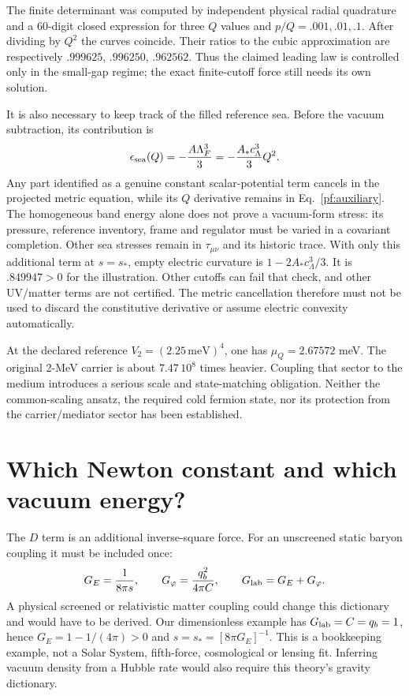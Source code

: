 \documentclass[11pt]{article}
\begin{document}
The finite determinant was computed by independent physical radial
quadrature and a 60-digit closed expression for three $Q$ values and
$p/Q=.001,.01,.1$. After dividing by $Q^2$ the curves coincide.
Their ratios to the cubic approximation are respectively
$.999625$, $.996250$, $.962562$. Thus the claimed leading law is controlled
only in the small-gap regime; the exact finite-cutoff force still needs
its own solution.

It is also necessary to keep track of the filled reference sea. Before
the vacuum subtraction, its contribution is
\begin{equation}
 \epsilon_{\rm sea}(Q)=-{A\Lambda_F^3\over3}
       =-{A_*c_\Lambda^3\over3}Q^2.
\end{equation}
Any part identified as a genuine constant scalar-potential term cancels
in the projected metric equation, while its $Q$ derivative remains in
Eq.~\eqref{pf:auxiliary}. The homogeneous band energy alone does not prove
a vacuum-form stress: its pressure, reference inventory, frame and regulator
must be varied in a covariant completion. Other sea stresses remain in
$\tau_{\mu\nu}$ and its historic trace. With only this
additional term at $s=s_*$, empty electric curvature is
$1-2A_*c_\Lambda^3/3$. It is $.849947>0$ for the illustration.
Other cutoffs can fail that check, and other UV/matter terms are not
certified. The metric cancellation therefore must not be used to discard
the constitutive derivative or assume electric convexity automatically.

At the declared reference $V_2=(2.25\,\mathrm{meV})^4$, one has
$\mu_Q=2.67572$ meV. The original 2-MeV carrier is about
$7.47\,10^8$ times heavier. Coupling that sector to the medium introduces
a serious scale and state-matching obligation. Neither the common-scaling
ansatz, the required cold fermion state, nor its protection from the
carrier/mediator sector has been established.

\section{Which Newton constant and which vacuum energy?}
The $D$ term is an additional inverse-square force. For an unscreened
static baryon coupling it must be included once:
\begin{equation}
 G_E={1\over8\pi s},\qquad
 G_\varphi={q_b^2\over4\pi C},\qquad
 G_{\rm lab}=G_E+G_\varphi.
\end{equation}
A physical screened or relativistic matter coupling could change this
dictionary and would have to be derived. Our dimensionless example has
$G_{\rm lab}=C=q_b=1$, hence $G_E=1-1/(4\pi)>0$ and
$s=s_*=[8\pi G_E]^{-1}$. This is a bookkeeping example, not a Solar
System, fifth-force, cosmological or lensing fit. Inferring vacuum density
from a Hubble rate would also require this theory's gravity dictionary.
\end{document}
